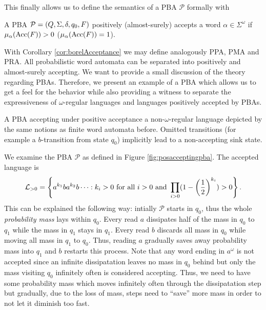 This finally allows us to define the semantics of a \ac{PBA} $\mathcal{P}$
formally with
\begin{definition}
  A \ac{PBA} $\mathcal{P} = \left(Q, \Sigma, \delta, q_{0}, F\right)$ positively 
  (almost-surely) accepts a word $\alpha\in\Sigma^{\omega}$ if
  $\mu_{\alpha}(\operatorname{Acc}(F)) > 0$ ($\mu_{\alpha}(\operatorname{Acc}(F)) = 1$).
\end{definition}
With Corollary \ref{cor:borelAcceptance} we may define analogously
\ac{PPA}, \ac{PMA} and \ac{PRA}. All probabilistic word automata can be
separated into positively and almost-surely accepting. We want to provide a
small discussion of the theory regarding \acp{PBA}. Therefore, we present an
example of a \ac{PBA} which allows us to get a feel for the behavior while also
providing a witness to separate the expressiveness of $\omega$-regular
languages and languages positively accepted by \acp{PBA}.
\begin{drawing}
  \caption{A \ac{PBA} accepting under positive acceptance a
  non-$\omega$-regular language depicted by the same notions as finite word
  automata before. Omitted transitions (for example a $b$-transition from state
  $q_{0}$) implicitly lead to a non-accepting sink state.}
  \label{fig:posacceptingpba}
  \begin{center}
  \end{center}
\end{drawing}
\begin{example}
  \cite{RecOmeLangProbAuto}
  We examine the \ac{PBA} $\mathcal{P}$ as defined in Figure 
  \ref{fig:posacceptingpba}. The accepted language is 
  \begin{equation*}
    \mathcal{L}_{>0} = \left\{a^{k_{1}}ba^{k_{2}}b\dots:k_{i}>0\text{ for all }
    i>0\text{ and } \prod_{i>0}(1-\left(\frac{1}{2}\right)^{k_{i}}) > 0\right\}.
  \end{equation*}
  This can be explained the following way: intially $\mathcal{P}$ starts in 
  $q_{0}$, thus the whole \emph{probability mass} lays within $q_{0}$. Every
  read $a$ dissipates half of the mass in $q_{0}$ to $q_{1}$ while the mass in
  $q_{1}$ stays in $q_{1}$. Every read $b$ discards all mass in $q_{0}$ while
  moving all mass in $q_{1}$ to $q_{0}$. Thus, reading $a$ gradually saves away
  probability mass into $q_{1}$ and $b$ restarts this process. Note that any 
  word ending in $a^{\omega}$ is not accepted since an infinite dissipatation 
  leaves no mass in $q_{0}$ behind but only the mass visiting $q_{0}$ 
  infinitely often is considered accepting. Thus, we need to have some 
  probability mass which moves infinitely often through the dissipatation step 
  but gradually, due to the loss of mass, steps need to \enquote{save} more 
  mass in order to not let it diminish too fast.
  \label{ex:posacceptingpba}
\end{example}
